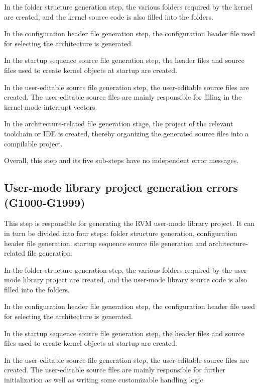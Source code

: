 In the folder structure generation step, the various folders required by the kernel are created, and the kernel source code is also filled into the folders.

In the configuration header file generation step, the configuration header file used for selecting the architecture is generated.

In the startup sequence source file generation step, the header files and source files used to create kernel objects at startup are created.

In the user-editable source file generation step, the user-editable source files are created. The user-editable source files are mainly responsible for filling in the kernel-mode interrupt vectors.

In the architecture-related file generation stage, the project of the relevant toolchain or IDE is created, thereby organizing the generated source files into a compilable project.

Overall, this step and its five sub-steps have no independent error messages.

\subsection{User-mode library project generation errors (G1000-G1999)}\label{subsec:5-6-8}

This step is responsible for generating the RVM user-mode library project. It can in turn be divided into four steps: folder structure generation, configuration header file generation, startup sequence source file generation and architecture-related file generation.

In the folder structure generation step, the various folders required by the user-mode library project are created, and the user-mode library source code is also filled into the folders.

In the configuration header file generation step, the configuration header file used for selecting the architecture is generated.

In the startup sequence source file generation step, the header files and source files used to create kernel objects at startup are created.

In the user-editable source file generation step, the user-editable source files are created. The user-editable source files are mainly responsible for further initialization as well as writing some customizable handling logic.

